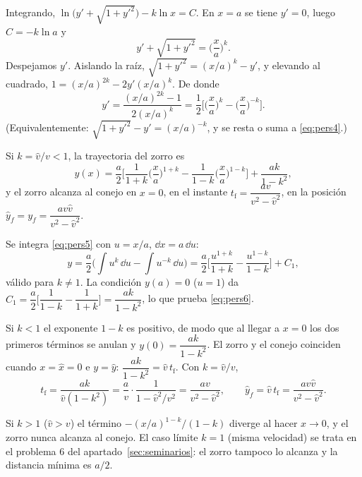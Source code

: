 \documentclass[11pt,twoside]{article}
\newcommand\vh{\hat v}
\newcommand\xh{\hat x}
\newcommand\yhh{\hat y}
\begin{document}
Integrando, $\ln\big(y'+\sqrt{1+y'^2}\big)-k\ln x=C$. En $x=a$ se tiene $y'=0$, luego $C=-k\ln a$ y
\begin{equation}\label{eq:pers4}
y'+\sqrt{1+y'^2}=\Big(\frac xa\Big)^{k}.
\end{equation}
Despejamos $y'$. Aislando la raíz, $\sqrt{1+y'^2}=(x/a)^k-y'$, y elevando al cuadrado, $1=(x/a)^{2k}-2y'(x/a)^k$. De donde
\begin{equation}\label{eq:pers5}
y'=\frac{(x/a)^{2k}-1}{2(x/a)^k}=\frac12\Big[\Big(\frac xa\Big)^{k}-\Big(\frac xa\Big)^{-k}\Big].
\end{equation}
(Equivalentemente: $\sqrt{1+y'^2}-y'=(x/a)^{-k}$, y se resta o suma a \eqref{eq:pers4}.)

\begin{teorema}\label{teo:zorro}
Si $k=\vh/v<1$, la trayectoria del zorro es
\begin{equation}\label{eq:pers6}
y(x)=\frac a2\Big[\frac1{1+k}\Big(\frac xa\Big)^{1+k}-\frac1{1-k}\Big(\frac xa\Big)^{1-k}\Big]+\frac{ak}{1-k^2},
\end{equation}
y el zorro alcanza al conejo en $x=0$, en el instante $t_{\mathrm f}=\dfrac{av}{v^2-\vh^2}$, en la posición
$\yhh_f=y_f=\dfrac{av\vh}{v^2-\vh^2}$.
\end{teorema}

\begin{demostracion}
Se integra \eqref{eq:pers5} con $u=x/a$, $\dd x=a\,\dd u$:
\begin{equation*}
y=\frac a2\Big(\int u^{k}\,\dd u-\int u^{-k}\,\dd u\Big)=\frac a2\Big[\frac{u^{1+k}}{1+k}-\frac{u^{1-k}}{1-k}\Big]+C_1,
\end{equation*}
válido para $k\neq1$. La condición $y(a)=0$ ($u=1$) da $C_1=\dfrac a2\Big[\dfrac1{1-k}-\dfrac1{1+k}\Big]=\dfrac{ak}{1-k^2}$, lo
que prueba \eqref{eq:pers6}.

Si $k<1$ el exponente $1-k$ es positivo, de modo que al llegar a $x=0$ los dos primeros términos se anulan y
$y(0)=\dfrac{ak}{1-k^2}$. El zorro y el conejo coinciden cuando $x=\xh=0$ e $y=\yhh$: $\dfrac{ak}{1-k^2}=\vh\,t_{\mathrm f}$. Con
$k=\vh/v$,
\begin{equation*}
t_{\mathrm f}=\frac{ak}{\vh(1-k^2)}=\frac av\cdot\frac1{1-\vh^2/v^2}=\frac{av}{v^2-\vh^2},\qquad
\yhh_f=\vh\,t_{\mathrm f}=\frac{av\vh}{v^2-\vh^2}.
\end{equation*}
\end{demostracion}

\begin{observacion}
Si $k>1$ ($\vh>v$) el término $-(x/a)^{1-k}/(1-k)$ diverge al hacer $x\to0$, y el zorro nunca alcanza al conejo. El caso
límite $k=1$ (misma velocidad) se trata en el problema 6 del apartado~\ref{sec:seminarios}: el zorro tampoco lo alcanza y la
distancia mínima es $a/2$.
\end{observacion}
\end{document}
